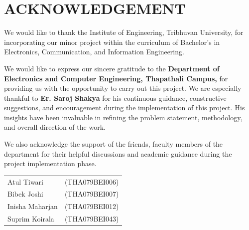 \newpage
\section*{ACKNOWLEDGEMENT}  
{}

We would like to thank the Institute of Engineering, Tribhuvan University, for incorporating
our minor project within the curriculum of Bachelor’s in Electronics, Communication,
and Information Engineering.

We would like to express our sincere gratitude to the \textbf{Department of Electronics
and Computer Engineering, Thapathali Campus,} for providing us with the
opportunity to carry out this project. We are especially thankful to \textbf{Er. Saroj Shakya}
for his continuous guidance, constructive suggestions, and encouragement during
the implementation of this project. His insights have been invaluable in refining
the problem statement, methodology, and overall direction of the work. 

We also acknowledge the support of the friends, faculty members of the department for their helpful
discussions and academic guidance during the project implementation phase.

\vspace{1cm}

\begin{tabular}{@{}l r@{}}
Atul Tiwari & (THA079BEI006) \\
Bibek Joshi & (THA079BEI007) \\
Inisha Maharjan & (THA079BEI012) \\
Suprim Koirala & (THA079BEI043) \\
\end{tabular}
